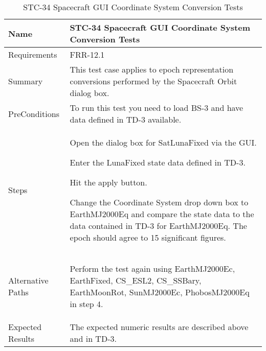 \begin{table}[htbp!]
\centering
      \begin{tabular}{|p{1.05 in} |p{4.75 in} |}
      \hline
         \rowcolor[rgb]{0.8,0.8,0.8} Name & STC-34 Spacecraft GUI Coordinate System Conversion Tests\\
         \hline
         Requirements & FRR-12.1\\ \hline
         Summary &
         This test case applies to epoch representation conversions performed by the Spacecraft Orbit dialog box.  \\
         \hline
         PreConditions & To run this test you need to load BS-3 and have data defined in TD-3 available.\\
         \hline
         Steps &
         \begin{compactenum}
         \item Open the dialog box for SatLunaFixed via the GUI.
         \item Enter the LunaFixed state data  defined in TD-3.
         \item Hit the apply button.
         \item Change the Coordinate System drop down box to EarthMJ2000Eq and compare the state data to
               the data contained in TD-3 for EarthMJ2000Eq. The epoch should agree to 15 significant
               figures.
         \end{compactenum}\\
		 \hline
         Alternative Paths &
         \begin{compactenum}
         \item Perform the test again using  EarthMJ2000Ec, EarthFixed, CS\_ESL2, CS\_SSBary, EarthMoonRot, SunMJ2000Ec, PhobosMJ2000Eq  in step 4.
         \end{compactenum}\\
         \hline
         Expected Results & The expected numeric results are described above and in TD-3.\\
      \hline
\end{tabular}
      \label{Table:STC-34}
      \caption{STC-34 Spacecraft GUI Coordinate System Conversion Tests}
\end{table} 